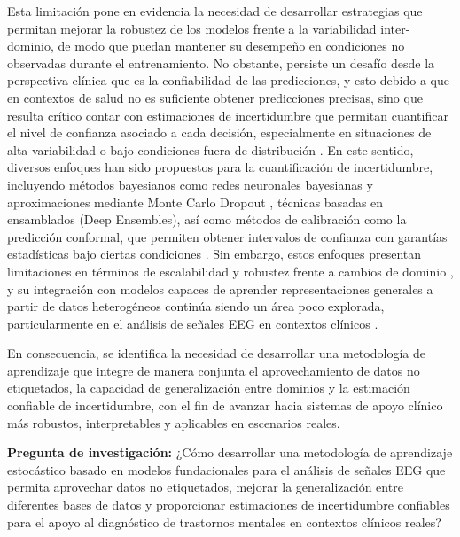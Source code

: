 Esta limitación pone en evidencia la necesidad de desarrollar estrategias que permitan mejorar la robustez de los modelos frente a la variabilidad inter-dominio, de modo que puedan mantener su desempeño en condiciones no observadas durante el entrenamiento. No obstante, persiste un desafío desde la perspectiva clínica que es la confiabilidad de las predicciones, y esto debido a que en contextos de salud no es suficiente obtener predicciones precisas, sino que resulta crítico contar con estimaciones de incertidumbre que permitan cuantificar el nivel de confianza asociado a cada decisión, especialmente en situaciones de alta variabilidad o bajo condiciones fuera de distribución \cite{yang2021uncertainty}. En este sentido, diversos enfoques han sido propuestos para la cuantificación de incertidumbre, incluyendo métodos bayesianos como redes neuronales bayesianas y aproximaciones mediante Monte Carlo Dropout \cite{ABDAR2021243}, técnicas basadas en ensamblados (Deep Ensembles), así como métodos de calibración como la predicción conformal, que permiten obtener intervalos de confianza con garantías estadísticas bajo ciertas condiciones \cite{GUTIERREZBECKER2018246,Jahani2024}. Sin embargo, estos enfoques presentan limitaciones en términos de escalabilidad y robustez frente a cambios de dominio \cite{ovadia2019trustmodelsuncertaintyevaluating,TVETER2026103374}, y su integración con modelos capaces de aprender representaciones generales a partir de datos heterogéneos continúa siendo un área poco explorada, particularmente en el análisis de señales EEG en contextos clínicos \cite{Loftus2022}.

En consecuencia, se identifica la necesidad de desarrollar una metodología de aprendizaje que integre de manera conjunta el aprovechamiento de datos no etiquetados, la capacidad de generalización entre dominios y la estimación confiable de incertidumbre, con el fin de avanzar hacia sistemas de apoyo clínico más robustos, interpretables y aplicables en escenarios reales.

\textbf{Pregunta de investigación:}  
¿Cómo desarrollar una metodología de aprendizaje estocástico basado en modelos fundacionales para el análisis de señales EEG que permita aprovechar datos no etiquetados, mejorar la generalización entre diferentes bases de datos y proporcionar estimaciones de incertidumbre confiables para el apoyo al diagnóstico de trastornos mentales en contextos clínicos reales?